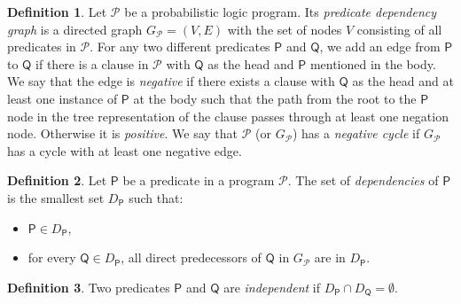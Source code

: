 \documentclass[letterpaper]{article}
\theoremstyle{definition}
\newtheorem{definition}{Definition}
\begin{document}
\begin{definition}
  Let $\mathscr{P}$ be a probabilistic logic program. Its \emph{predicate
    dependency graph} is a directed graph $G_{\mathscr{P}} = (V, E)$ with the
  set of nodes $V$ consisting of all predicates in $\mathscr{P}$. For any two
  different predicates $\mathsf{P}$ and $\mathsf{Q}$, we add an edge from
  $\mathsf{P}$ to $\mathsf{Q}$ if there is a clause in $\mathscr{P}$ with
  $\mathsf{Q}$ as the head and $\mathsf{P}$ mentioned in the body. We say that
  the edge is \emph{negative} if there exists a clause with $\mathsf{Q}$ as the
  head and at least one instance of $\mathsf{P}$ at the body such that the path
  from the root to the $\mathsf{P}$ node in the tree representation of the
  clause passes through at least one negation node. Otherwise it is
  \emph{positive}. We say that $\mathscr{P}$ (or $G_{\mathscr{P}}$) has a
  \emph{negative cycle} if $G_{\mathscr{P}}$ has a cycle with at least one
  negative edge.
\end{definition}

\begin{definition}
  Let $\mathsf{P}$ be a predicate in a program $\mathscr{P}$. The set of
  \emph{dependencies} of $\mathsf{P}$ is the smallest set $D_{\mathsf{P}}$ such
  that:
  \begin{itemize}
  \item $\mathsf{P} \in D_{\mathsf{P}}$,
  \item for every $\mathsf{Q} \in D_{\mathsf{P}}$, all direct predecessors of
    $\mathsf{Q}$ in $G_{\mathscr{P}}$ are in $D_{\mathsf{P}}$.
  \end{itemize}
\end{definition}

\begin{definition}
  Two predicates $\mathsf{P}$ and $\mathsf{Q}$ are \emph{independent} if
  $D_{\mathsf{P}} \cap D_{\mathsf{Q}} = \emptyset$.
\end{definition}
\end{document}
